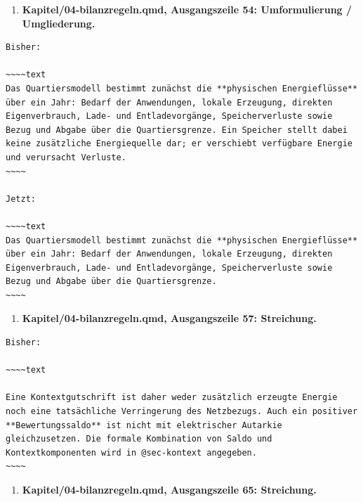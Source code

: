 \documentclass[
  ngerman,
  a4paper,
  DIV=11]{scrreprt}
\providecommand{\tightlist}{%
  \setlength{\itemsep}{0pt}\setlength{\parskip}{0pt}}
\begin{document}
\begin{enumerate}
\def\labelenumi{\arabic{enumi}.}
\setcounter{enumi}{109}
\tightlist
\item
  \textbf{Kapitel/04-bilanzregeln.qmd, Ausgangszeile 54: Umformulierung
  / Umgliederung.}
\end{enumerate}

\begin{verbatim}
Bisher:

~~~~text
Das Quartiersmodell bestimmt zunächst die **physischen Energieflüsse** über ein Jahr: Bedarf der Anwendungen, lokale Erzeugung, direkten Eigenverbrauch, Lade- und Entladevorgänge, Speicherverluste sowie Bezug und Abgabe über die Quartiersgrenze. Ein Speicher stellt dabei keine zusätzliche Energiequelle dar; er verschiebt verfügbare Energie und verursacht Verluste.
~~~~

Jetzt:

~~~~text
Das Quartiersmodell bestimmt zunächst die **physischen Energieflüsse** über ein Jahr: Bedarf der Anwendungen, lokale Erzeugung, direkten Eigenverbrauch, Lade- und Entladevorgänge, Speicherverluste sowie Bezug und Abgabe über die Quartiersgrenze.
~~~~
\end{verbatim}

\begin{enumerate}
\def\labelenumi{\arabic{enumi}.}
\setcounter{enumi}{110}
\tightlist
\item
  \textbf{Kapitel/04-bilanzregeln.qmd, Ausgangszeile 57: Streichung.}
\end{enumerate}

\begin{verbatim}
Bisher:

~~~~text

Eine Kontextgutschrift ist daher weder zusätzlich erzeugte Energie noch eine tatsächliche Verringerung des Netzbezugs. Auch ein positiver **Bewertungssaldo** ist nicht mit elektrischer Autarkie gleichzusetzen. Die formale Kombination von Saldo und Kontextkomponenten wird in @sec-kontext angegeben.
~~~~
\end{verbatim}

\begin{enumerate}
\def\labelenumi{\arabic{enumi}.}
\setcounter{enumi}{111}
\tightlist
\item
  \textbf{Kapitel/04-bilanzregeln.qmd, Ausgangszeile 65: Streichung.}
\end{enumerate}
\end{document}
